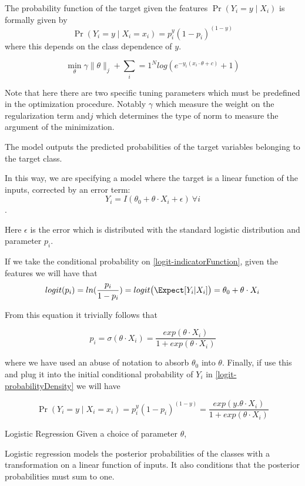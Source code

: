 The probability function of the target given the features $\Pr(Y_i=y\mid X_i)$ is formally given by 
$$\Pr(Y_i=y \mid X_i = x_i) = p_i^{y} (1-p_i)^{(1-y)}$$\label{logit-probabilityDensity}
where this depends on the class dependence of $y$.



\begin{equation} \label{logit}
\min_{\theta} \gamma\| \theta\|_{j}  + \sum_i=1^N log(e^{-y_i (x_i \cdot \theta + c )} +1) 
\end{equation}

Note that here there are two specific tuning parameters which must be predefined in the optimization procedure. Notably $\gamma$ which measure the weight on the regularization term and$j$ which determines the type of norm to measure the argument of the minimization.

The model outputs the predicted probabilities of the target variables belonging to the target class.

In this way, we are specifying a model where the target is a linear function of the inputs, corrected by an error term:
$$Y_i = I(\theta_0 + \theta \cdot X_i + \epsilon) \ \forall i$$. \label{logit-indicatorFunction}

Here $\epsilon$ is the error which is distributed with the standard logistic distribution and parameter $p_i$. 

If we take the conditional probability on \ref{logit-indicatorFunction}, given the features we will have that
$$logit(p_i)= ln(\frac{p_i}{1-p_i}) = logit\big( \Expect[Y_i| X_i] \big) = 	\theta_0 + \theta \cdot X_i$$

From this equation it trivially follows that

$$p_i = \sigma(\theta \cdot X_i) = \frac{exp(\theta \cdot X_i) }{1 + exp(\theta \cdot X_i)}$$

where we have used an abuse of notation to absorb $\theta_0$ into $\theta$. Finally, if use this and plug it into the initial conditional probability of $Y_i$ in \ref{logit-probabilityDensity} we will have

$$  \Pr(Y_i=y \mid X_i = x_i) =  p_i^{y} (1-p_i)^{(1-y)} = \frac{exp(y . \theta \cdot X_i) }{1 + exp(\theta \cdot X_i)}$$



\begin{definition}{Logistic Regression}
	Given a choice of parameter $\theta$, 	
\end{definition}

Logistic regression models the posterior probabilities of the classes with a transformation on a linear function of inputs. It also conditions that the posterior probabilities must sum to one.

